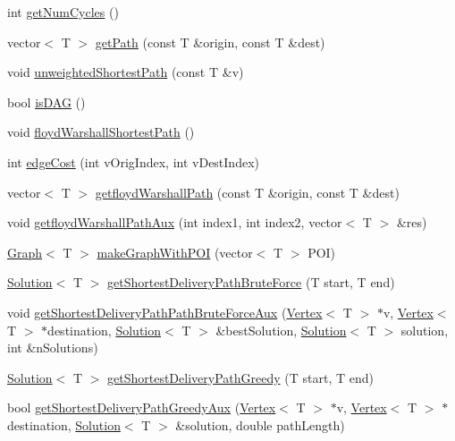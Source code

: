 \begin{DoxyCompactItemize}
\item 
int \hyperlink{class_graph_a694dff81073c38b669057f0c6bd4cbb1}{get\+Num\+Cycles} ()
\item 
vector$<$ T $>$ \hyperlink{class_graph_ab4054ca572c10669dd3e05d6d41c116c}{get\+Path} (const T \&origin, const T \&dest)
\item 
void \hyperlink{class_graph_ae5264597aacaf4f45819e96a6d6c89aa}{unweighted\+Shortest\+Path} (const T \&v)
\item 
bool \hyperlink{class_graph_ab49d07c2bd6b8b30d5ae82bc558b821a}{is\+D\+A\+G} ()
\item 
void \hyperlink{class_graph_ae5161f4408bf1ead2b29d19d67fb04ee}{floyd\+Warshall\+Shortest\+Path} ()
\item 
int \hyperlink{class_graph_a7e137f1ef838395ac1044a944fa54448}{edge\+Cost} (int v\+Orig\+Index, int v\+Dest\+Index)
\item 
vector$<$ T $>$ \hyperlink{class_graph_ab23d1dae92a7f2b29dcb91a94336674c}{getfloyd\+Warshall\+Path} (const T \&origin, const T \&dest)
\item 
void \hyperlink{class_graph_aad1eda4beb8425d03ed1f3b8af397563}{getfloyd\+Warshall\+Path\+Aux} (int index1, int index2, vector$<$ T $>$ \&res)
\item 
\hyperlink{class_graph}{Graph}$<$ T $>$ \hyperlink{class_graph_a9589ad69099d91bfd77994d0e8558267}{make\+Graph\+With\+P\+O\+I} (vector$<$ T $>$ P\+O\+I)
\item 
\hyperlink{struct_solution}{Solution}$<$ T $>$ \hyperlink{class_graph_afbc0a16b439743653af993e3550b0429}{get\+Shortest\+Delivery\+Path\+Brute\+Force} (T start, T end)
\item 
void \hyperlink{class_graph_af22be17fb9d07eebc8463e75afac9e73}{get\+Shortest\+Delivery\+Path\+Path\+Brute\+Force\+Aux} (\hyperlink{class_vertex}{Vertex}$<$ T $>$ $\ast$v, \hyperlink{class_vertex}{Vertex}$<$ T $>$ $\ast$destination, \hyperlink{struct_solution}{Solution}$<$ T $>$ \&best\+Solution, \hyperlink{struct_solution}{Solution}$<$ T $>$ solution, int \&n\+Solutions)
\item 
\hyperlink{struct_solution}{Solution}$<$ T $>$ \hyperlink{class_graph_a8412825c9904d192c03770d387c1a5bf}{get\+Shortest\+Delivery\+Path\+Greedy} (T start, T end)
\item 
bool \hyperlink{class_graph_a90baa6b7442a9396d602b7b5d982ff89}{get\+Shortest\+Delivery\+Path\+Greedy\+Aux} (\hyperlink{class_vertex}{Vertex}$<$ T $>$ $\ast$v, \hyperlink{class_vertex}{Vertex}$<$ T $>$ $\ast$destination, \hyperlink{struct_solution}{Solution}$<$ T $>$ \&solution, double path\+Length)
\end{DoxyCompactItemize}



